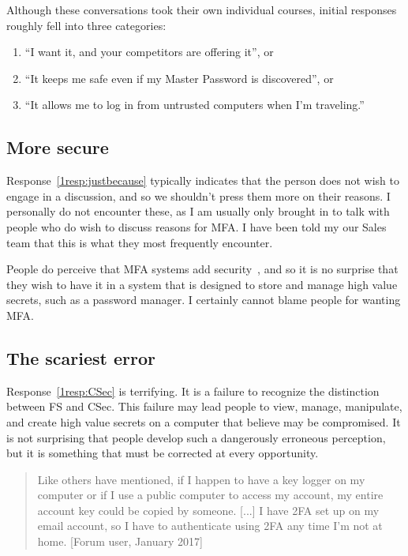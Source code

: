 \documentclass{soups}
\newcommand{\prop}[1]{\textsf{#1}}
\begin{document}
Although these conversations took their own individual courses,
initial responses roughly fell into three categories:
\begin{enumerate}
  \item “I want it, and your competitors are offering it”, or \label{1resp:justbecause}
  \item “It keeps me safe even if my Master Password is discovered”, or \label{1resp:FS}
  \item “It allows me to log in from untrusted computers when I'm traveling.”\label{1resp:CSec}
\end{enumerate}

\subsection{More secure}
Response~\ref{1resp:justbecause} typically indicates that the person does not wish to engage in a discussion, and so we shouldn't press them more on their reasons.
I personally do not encounter these, as I am usually only brought in to talk with people who do wish to discuss reasons for MFA\@.
I have been told my our Sales team that this is what they most frequently encounter.

People do perceive that MFA systems add security~\autocites{gunsonETAL2011:CS,CristofaroDFN13},
and so it is no surprise that they wish to have it in a system that is designed to store and manage high value secrets, such as a password manager.
I certainly cannot blame people for wanting MFA\@.

\subsection{The scariest error}

Response~\ref{1resp:CSec} is terrifying.
It is a failure to recognize the distinction between \prop{FS} and  \prop{CSec}.
This failure may lead people to view, manage, manipulate, and create high value
secrets on a computer that believe may be compromised. It is not surprising that people develop such a dangerously erroneous perception, but it is something that must be corrected at every opportunity.

\begin{quotation}
  Like others have mentioned, if I happen to have a key logger on my computer or if I use a public computer to access my account, my entire account key could be copied by someone. [...] I have 2FA set up on my email account, so I have to authenticate using 2FA any time I'm not at home.
  [Forum user, January 2017]
\end{quotation}
\end{document}

